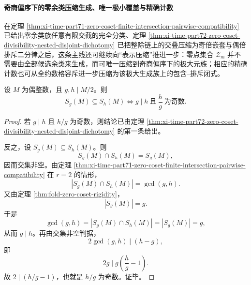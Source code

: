 \paragraph{奇商偏序下的零余类压缩生成、唯一极小覆盖与精确计数}
在定理 \ref{thm:xi-time-part71-zero-coset-finite-intersection-pairwise-compatibility} 已给出零余类族任意有限交截的完全分类、定理 \ref{thm:xi-time-part72-zero-coset-divisibility-nested-disjoint-dichotomy} 已把整除链上的交叠压缩为奇倍嵌套与偶倍排斥二分律之后，这条主线还可继续向“表示压缩”推进一步：零点集合 \(\mathcal Z_m\) 并不需要由全部候选余类来生成，而可唯一压缩到奇商偏序下的极大元族；相应的精确计数也可从全约数格容斥进一步压缩为该极大生成族上的包含--排斥闭式。

\begin{theorem}[零余类之间的全局包含关系由奇商整除完全刻画]\label{thm:xi-time-part72a-zero-coset-global-inclusion-odd-divisibility}
设 \(M\) 为偶整数，且 \(g,h\mid M/2\)。则
\[
S_g(M)\subseteq S_h(M)
\iff
g\mid h\ \text{且}\ \frac{h}{g}\ \text{为奇数}.
\]
\end{theorem}
\begin{proof}
若 \(g\mid h\) 且 \(h/g\) 为奇数，则结论已由定理 \ref{thm:xi-time-part72-zero-coset-divisibility-nested-disjoint-dichotomy} 的第一条给出。

反之，设 \(S_g(M)\subseteq S_h(M)\)。则
\[
S_g(M)\cap S_h(M)=S_g(M),
\]
因而交集非空。由定理 \ref{thm:xi-time-part71-zero-coset-finite-intersection-pairwise-compatibility} 在 \(r=2\) 的情形，
\[
\left|S_g(M)\cap S_h(M)\right|=\gcd(g,h).
\]
又由定理 \ref{thm:fold-zero-coset-rigidity}，
\[
|S_g(M)|=g.
\]
于是
\[
\gcd(g,h)=|S_g(M)\cap S_h(M)|=|S_g(M)|=g,
\]
从而 \(g\mid h\)。再由交集非空判据，
\[
2\gcd(g,h)\mid (h-g),
\]
即
\[
2g\mid g\left(\frac{h}{g}-1\right).
\]
故 \(2\mid (h/g-1)\)，也就是 \(h/g\) 为奇数。证毕。
\end{proof}


